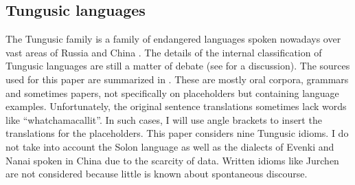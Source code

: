 \documentclass[output=paper,colorlinks,citecolor=brown
\ChapterDOI{10.5281/zenodo.15697577}
]{langscibook}
\begin{document}
\subsection{Tungusic languages}
The Tungusic family is a family of endangered languages spoken nowadays over vast areas of Russia and China \citep{Hölzl2022}. The details of the internal classification of Tungusic languages are still a matter of debate (see \citealt{Oskolskayaetal2022} for a discussion). The sources used for this paper are summarized in . These are mostly oral corpora, grammars and sometimes papers, not specifically on placeholders but containing language examples. Unfortunately, the original sentence translations sometimes lack words like ``whatchamacallit''. In such cases, I will use angle brackets to insert the translations for the placeholders. This paper considers nine Tungusic idioms. I do not take into account the Solon language as well as the dialects of Evenki and Nanai spoken in China due to the scarcity of data. Written idioms like Jurchen are not considered because little is known about spontaneous discourse.
\end{document}
